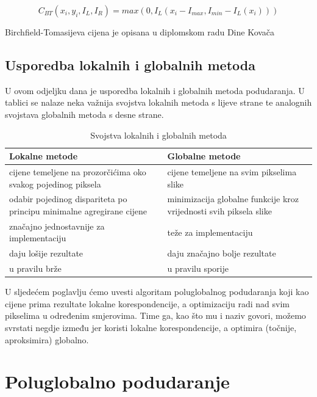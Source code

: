 \documentclass[utf8, zavrsni, numeric]{fer}
\begin{document}
\begin{equation}
C_{BT}(x_i, y_i, I_L, I_R) = max(0, I_L(x_i - I_{max}, I_{min} - I_L(x_i)))
\end{equation}

Birchfield-Tomasijeva cijena je opisana u diplomskom radu Dine Kovača %

\section{Usporedba lokalnih i globalnih metoda}
U ovom odjeljku dana je usporedba lokalnih i globalnih metoda podudaranja.
U tablici se nalaze neka važnija svojstva lokalnih metoda s lijeve strane te
analognih svojstava globalnih metoda s desne strane.

\begin{table}[H]
  \caption{Svojstva lokalnih i globalnih metoda}
  \label{tbl:usp_lok_glob}
  \centering
  \begin{tabularx}{\textwidth}{X|X} \hline
    {\bf Lokalne metode} & {\bf Globalne metode} \\
    \hline
    cijene temeljene na prozorčićima oko svakog pojedinog piksela & cijene temeljene na svim pikselima slike \\
    \hline
    odabir pojedinog dispariteta po principu minimalne agregirane cijene & minimizacija globalne funkcije kroz vrijednosti svih piksela slike \\
    \hline
    značajno jednostavnije za implementaciju & teže za implementaciju \\
    \hline
    daju lošije rezultate & daju značajno bolje rezultate \\
    \hline
    u pravilu brže & u pravilu sporije \\
  \end{tabularx}
\end{table}

U sljedećem poglavlju ćemo uvesti algoritam poluglobalnog podudaranja koji kao cijene prima rezultate lokalne korespondencije, a optimizaciju radi nad svim
pikselima u određenim smjerovima. Time ga, kao što mu i naziv govori, možemo svrstati negdje između jer koristi lokalne korespondencije, a optimira (točnije, aproksimira) globalno.


\chapter{Poluglobalno podudaranje}
\end{document}
